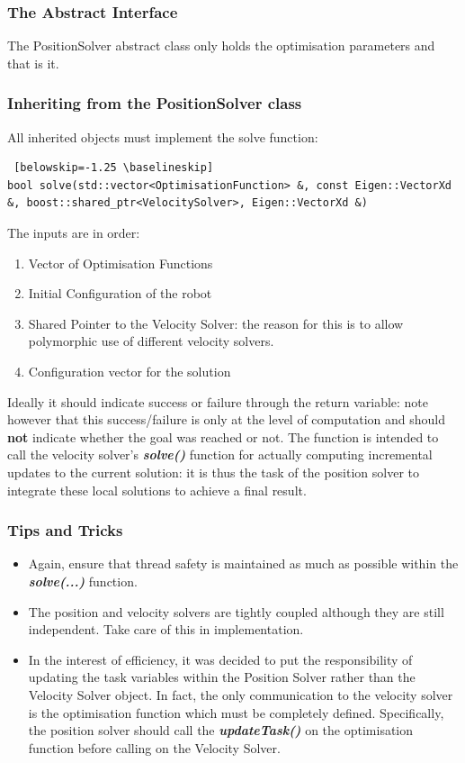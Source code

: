 \documentclass[12pt,a4paper,onecolumn]{article}
\begin{document}
\subsubsection*{The Abstract Interface}
The PositionSolver abstract class only holds the optimisation parameters and that is it.
\subsubsection*{Inheriting from the PositionSolver class}
All inherited objects must implement the solve function:
\begin{lstlisting} [belowskip=-1.25 \baselineskip]
bool solve(std::vector<OptimisationFunction> &, const Eigen::VectorXd &, boost::shared_ptr<VelocitySolver>, Eigen::VectorXd &)
\end{lstlisting}
The inputs are in order:
\begin{enumerate}
\item Vector of Optimisation Functions
\item Initial Configuration of the robot
\item Shared Pointer to the Velocity Solver: the reason for this is to allow polymorphic use of different velocity solvers.
\item Configuration vector for the solution
\end{enumerate}
Ideally it should indicate success or failure through the return variable: note however that this success/failure is only at the level of computation and should \textbf{not} indicate whether the goal was reached or not. The function is intended to call the velocity solver's \textbf{\textit{solve()}} function for actually computing incremental updates to the current solution: it is thus the task of the position solver to integrate these local solutions to achieve a final result.

\subsubsection*{Tips and Tricks}
\begin{itemize}
\item Again, ensure that thread safety is maintained as much as possible within the \textit{\textbf{solve(...)}} function.
\item The position and velocity solvers are tightly coupled although they are still independent. Take care of this in implementation.
\item In the interest of efficiency, it was decided to put the responsibility of updating the task variables within the Position Solver rather than the Velocity Solver object. In fact, the only communication to the velocity solver is the optimisation function which must be completely defined. Specifically, the position solver should call the \textbf{\textit{updateTask()}} on the optimisation function before calling on the Velocity Solver.
\end{itemize}
\end{document}
